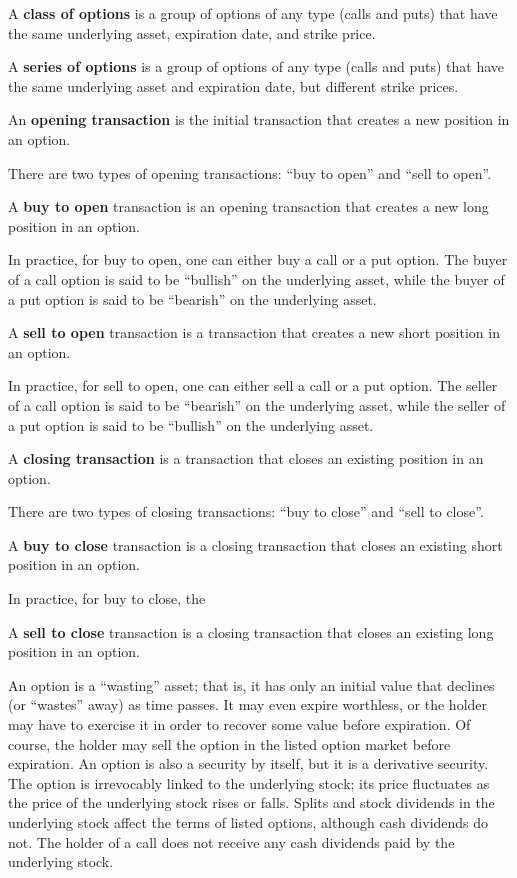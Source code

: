 A \textbf{class of options} is a group of options of any type (calls and puts) that have the same underlying asset,
expiration date, and strike price.
\ed

A \textbf{series of options} is a group of options of any type (calls and puts) that have the same underlying asset and
expiration date, but different strike prices.
\ed

An \textbf{opening transaction} is the initial transaction that creates a new position in an option.
\ed

There are two types of opening transactions: ``buy to open'' and ``sell to open''.

A \textbf{buy to open} transaction is an opening transaction that creates a new long position in an option.
\ed

In practice, for buy to open, one can either buy a call or a put option. The buyer of a call option is said to be
``bullish'' on the underlying asset, while the buyer of a put option is said to be ``bearish'' on the underlying asset.

A \textbf{sell to open} transaction is a transaction that creates a new short position in an option.
\ed

In practice, for sell to open, one can either sell a call or a put option. The seller of a call option is said to be
``bearish'' on the underlying asset, while the seller of a put option is said to be ``bullish'' on the underlying asset.

A \textbf{closing transaction} is a transaction that closes an existing position in an option.
\ed

There are two types of closing transactions: ``buy to close'' and ``sell to close''.

A \textbf{buy to close} transaction is a closing transaction that closes an existing short position in an option.
\ed

In practice, for buy to close, the

A \textbf{sell to close} transaction is a closing transaction that closes an existing long position in an option.
\ed






An option is a ``wasting'' asset; that is, it has only an initial value that declines (or ``wastes'' away) as time
passes. It may even expire worthless, or the holder may have to exercise it in order to recover some value before
expiration. Of course, the holder may sell the option in the listed option market before expiration. An option is
also a security by itself, but it is a derivative security. The option is irrevocably linked to the underlying
stock; its price fluctuates as the price of the underlying stock rises or falls. Splits and stock dividends in the
underlying stock affect the terms of listed options, although cash dividends do not. The holder of a call does not
receive any cash dividends paid by the underlying stock.



